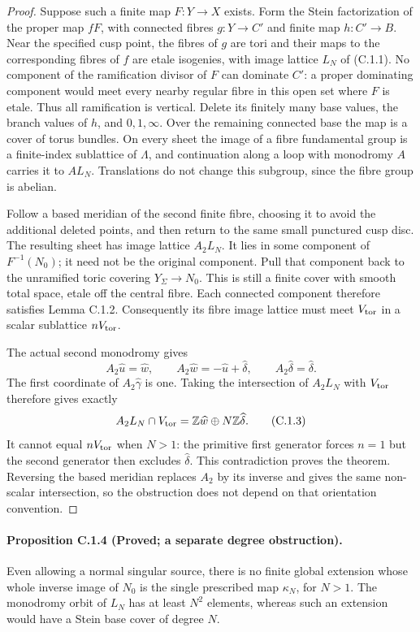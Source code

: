 \begin{proof}
Suppose such a finite map $F:Y\to X$ exists. Form the Stein factorization
of the proper map $fF$, with connected fibres $g:Y\to C'$ and finite map
$h:C'\to B$. Near the specified cusp point, the fibres of $g$ are tori
and their maps to the corresponding fibres of $f$ are etale isogenies,
with image lattice $L_N$ of (C.1.1). No component of the ramification
divisor of $F$ can dominate $C'$: a proper dominating component would
meet every nearby regular fibre in this open set where $F$ is etale.
Thus all ramification is vertical. Delete its finitely many base values,
the branch values of $h$, and $0,1,\infty$. Over the remaining connected
base the map is a cover of torus bundles. On every sheet the image
of a fibre fundamental group is a finite-index sublattice of $\Lambda$,
and continuation along a loop with monodromy $A$ carries it to $AL_N$.
Translations do not change this subgroup, since the fibre group is abelian.

Follow a based meridian of the second finite fibre, choosing it to avoid
the additional deleted points, and then return to the same small
punctured cusp disc. The resulting sheet has image lattice $A_2L_N$.
It lies in some component of $F^{-1}(N_0)$; it need not be the original
component. Pull that component back to the unramified toric covering
$Y_\Sigma\to N_0$. This is still a finite cover with smooth total space,
etale off the central fibre. Each connected component therefore satisfies
Lemma C.1.2. Consequently its fibre image lattice must meet
$V_{\rm tor}$ in a scalar sublattice $nV_{\rm tor}$.

The actual second monodromy gives
\[
 A_2\widehat u=\widehat w,\qquad
 A_2\widehat w=-\widehat u+\widehat\delta,\qquad
 A_2\widehat\delta=\widehat\delta.
\]
The first coordinate of $A_2\widehat\gamma$ is one. Taking the
intersection of $A_2L_N$ with $V_{\rm tor}$ therefore gives exactly
\[
 A_2L_N\cap V_{\rm tor}
   =\mathbb Z\widehat w\oplus N\mathbb Z\widehat\delta.
 \tag{C.1.3}
\]
It cannot equal $nV_{\rm tor}$ when $N>1$: the primitive first generator
forces $n=1$ but the second generator then excludes
$\widehat\delta$. This contradiction proves the theorem. Reversing the
based meridian replaces $A_2$ by its inverse and gives the same
non-scalar intersection, so the obstruction does not depend on that
orientation convention.
\end{proof}

\paragraph{Proposition C.1.4 (Proved; a separate degree obstruction).}
Even allowing a normal singular source, there is no finite global
extension whose whole inverse image of $N_0$ is the single prescribed
map $\kappa_N$, for $N>1$. The monodromy orbit of $L_N$ has at least
$N^2$ elements, whereas such an extension would have a Stein base cover
of degree $N$.

